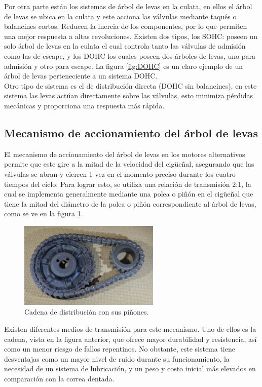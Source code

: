 Por otra parte están los sistemas de árbol de levas en la culata, en ellos el árbol de levas se ubica en la culata y este acciona las válvulas mediante taqués o balancines cortos. Reducen la inercia de los componentes, por lo que permiten una mejor respuesta a altas revoluciones. Existen dos tipos, los SOHC: poseen un solo árbol de levas en la culata el cual controla tanto las válvulas de admisión como las de escape, y los DOHC los cuales poseen dos árboles de levas, uno para admisión y otro para escape. La figura \ref{fig:DOHC} es un claro ejemplo de un árbol de levas perteneciente a un sistema DOHC.\\

Otro tipo de sistema es el de distribución directa (DOHC sin balancines), en este sistema las levas actúan directamente sobre las válvulas, esto minimiza pérdidas mecánicas y proporciona una respuesta más rápida.

\subsection{Mecanismo de accionamiento del árbol de levas} \label{ss:camshaftchain}

El mecanismo de accionamiento del árbol de levas en los motores alternativos permite que este gire a la mitad de la velocidad del cigüeñal, asegurando que las válvulas se abran y cierren 1 vez en el momento preciso durante los cuatro tiempos del ciclo. Para lograr esto, se utiliza una relación de transmisión 2:1, la cual se implementa generalmente mediante una polea o piñón en el cigüeñal que tiene la mitad del diámetro de la polea o piñón correspondiente al árbol de levas, como se ve en la figura \ref{fig:chain}.

\begin{figure}[H]
	\centering
	\includegraphics[width=0.6\textwidth]{Figures/01/m2/dist_chain.jpg}
	\caption{Cadena de distribución con sus piñones.}
	\label{fig:chain}
\end{figure}

Existen diferentes medios de transmisión para este mecanismo. Uno de ellos es la cadena, vista en la figura anterior, que ofrece mayor durabilidad y resistencia, así como un menor riesgo de fallos repentinos. No obstante, este sistema tiene desventajas como un mayor nivel de ruido durante su funcionamiento, la necesidad de un sistema de lubricación, y un peso y costo inicial más elevados en comparación con la correa dentada.

